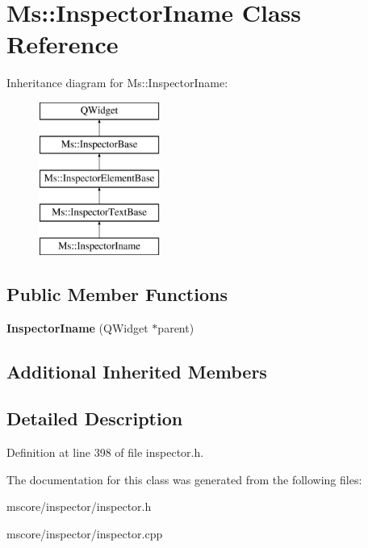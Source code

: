 \hypertarget{class_ms_1_1_inspector_iname}{}\section{Ms\+:\+:Inspector\+Iname Class Reference}
\label{class_ms_1_1_inspector_iname}
Inheritance diagram for Ms\+:\+:Inspector\+Iname\+:\begin{figure}[H]
\begin{center}
\leavevmode
\includegraphics[height=5.000000cm]{class_ms_1_1_inspector_iname}
\end{center}
\end{figure}
\subsection*{Public Member Functions}
\begin{DoxyCompactItemize}
\item 
\mbox{\label{class_ms_1_1_inspector_iname_ac8dfb08496ed93fd035fea074a84b2c1}} 
{\bfseries Inspector\+Iname} (Q\+Widget $\ast$parent)
\end{DoxyCompactItemize}
\subsection*{Additional Inherited Members}


\subsection{Detailed Description}


Definition at line 398 of file inspector.\+h.



The documentation for this class was generated from the following files\+:\begin{DoxyCompactItemize}
\item 
mscore/inspector/inspector.\+h\item 
mscore/inspector/inspector.\+cpp\end{DoxyCompactItemize}
